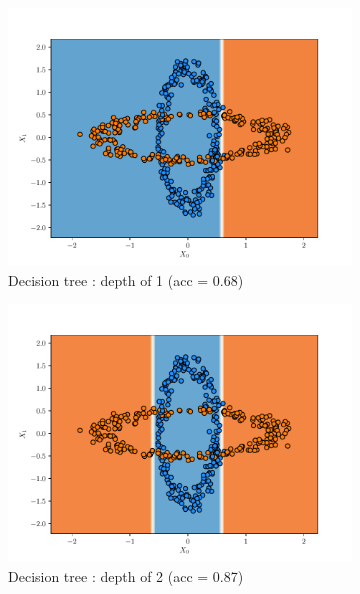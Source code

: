 \begin{figure}[H]
    \centering
    \begin{subfigure}{0.495\textwidth}
        \includegraphics[width=\textwidth]{resources/pdf/make_data1_dt_1.pdf}
        \caption{Decision tree : depth of 1 (acc = \num{0.68})}
    \end{subfigure}
    \begin{subfigure}{0.495\textwidth}
        \includegraphics[width=\textwidth]{resources/pdf/make_data1_dt_2.pdf}
        \caption{Decision tree : depth of 2 (acc = \num{0.87})}
    \end{subfigure}
    \vspace{3pt}
    \begin{subfigure}{0.495\textwidth}

\end{subfigure}
\end{figure}
